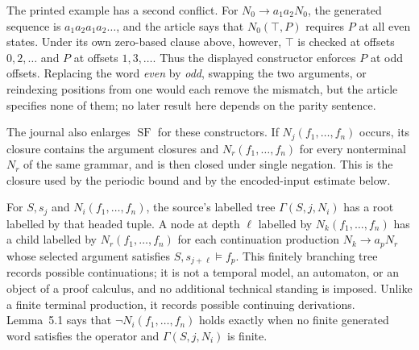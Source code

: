 The printed example has a second conflict.  For
\(N_0\to a_1a_2N_0\), the generated sequence is
\(a_1a_2a_1a_2\ldots\), and the article says that
\(N_0(\top,P)\) requires \(P\) at all even states.  Under its own zero-based
clause above, however, \(\top\) is checked at offsets \(0,2,\ldots\) and
\(P\) at offsets \(1,3,\ldots\).  Thus the displayed constructor enforces
\(P\) at odd offsets.  Replacing the word \emph{even} by \emph{odd}, swapping
the two arguments, or reindexing positions from one would each remove the
mismatch, but the article specifies none of them; no later result here depends
on the parity sentence.

The journal also enlarges \(\operatorname{SF}\) for these constructors.  If
\(N_j(f_1,\ldots,f_n)\) occurs, its closure contains the argument closures and
\(N_r(f_1,\ldots,f_n)\) for every nonterminal \(N_r\) of the same grammar,
and is then closed under single negation.  This is the closure used by the
periodic bound and by the encoded-input estimate below.

For \(S,s_j\) and \(N_i(f_1,\ldots,f_n)\), the source's labelled tree
\(\Gamma(S,j,N_i)\) has a root labelled by that headed tuple.  A node at depth
\(\ell\) labelled by \(N_k(f_1,\ldots,f_n)\) has a child labelled by
\(N_r(f_1,\ldots,f_n)\) for each continuation production
\(N_k\to a_pN_r\) whose selected argument satisfies
\(S,s_{j+\ell}\models f_p\).  This finitely branching tree records possible
continuations; it is not a temporal model, an automaton, or an object of a
proof calculus, and no additional technical standing is imposed.
Unlike a finite terminal production, it records possible continuing
derivations.  Lemma~5.1 says that
\(\neg N_i(f_1,\ldots,f_n)\) holds exactly when no finite generated word
satisfies the operator and \(\Gamma(S,j,N_i)\) is finite.

